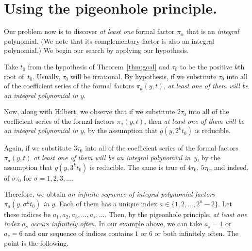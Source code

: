 \documentclass{article}
\theoremstyle{plain}
\theoremstyle{definition}
\begin{document}

\section{Using the pigeonhole principle.}
\label{sec:php}


Our problem now is to discover \emph{at least one} formal factor $\pi_{\alpha}$ that is an
\emph{integral} polynomial.  (We note that its complementary factor is also an integral polynomial.) We begin our search by applying our
hypothesis.


Take $t_0$ from the hypothesis of Theorem~\ref{thm:goal}
and $\tau_0$ to be the
positive $k$th root of~$t_0$. Usually, $\tau_0$ will be
irrational. By hypothesis, if we substitute $\tau_0$ into all of the
coefficient series of the formal factors $\pi_a(y,t)$, \emph{at least
one of them will be an integral polynomial in $y$}.

Now, along with Hilbert, we observe that if we substitute $2\tau_0$ into all
of the coefficient series of the formal factors $\pi_a(y,t)$, then
\emph{at least one of them will be an integral polynomial in $y$}, by
the assumption that $g(y,2^k t_0)$ is reducible.

Again, if we substitute $3\tau_0$ into all of the coefficient series
of the formal factors $\pi_a(y,t)$ \emph{at least one of them will be
an integral polynomial in~$y$}, by the assumption that $g(y,3^kt_0)$
is reducible. The same is true of $4\tau_0$, $5\tau_0$, and indeed, of
$\sigma\tau_0$ for $\sigma = 1,2,3,\dots$.

Therefore, we obtain \emph{an infinite sequence of integral polynomial
factors $\pi_a(y,\sigma^k t_0)$ in $y$}. Each of them has a unique
index $a \in \{1,2,\dots, 2^n - 2\}$. Let these indices be
$a_1,a_2,a_3,\dots,a_s,\dots$. Then, by the pigeonhole principle,
\emph{at least one index $a_s$ occurs infinitely often}. In our
example above, we can take $a_s = 1$ or $a_s = 6$ and our sequence of
indices contains $1$ or $6$ or both infinitely often. The point
is the following.


\end{document}
